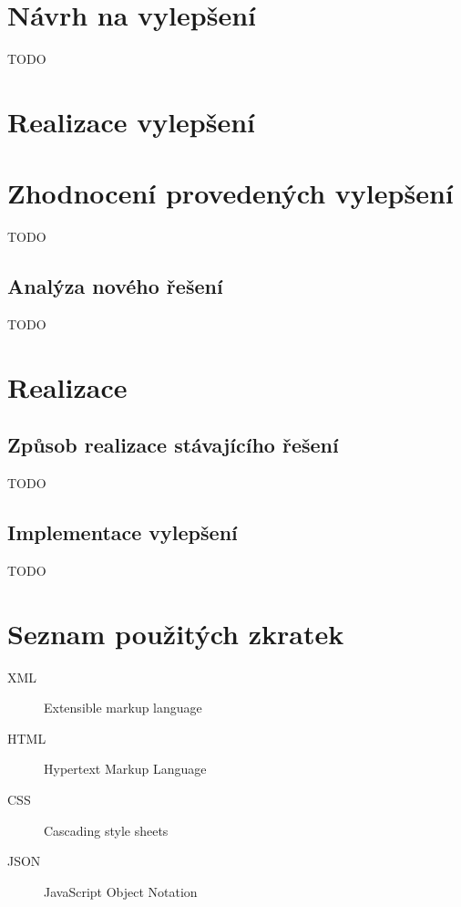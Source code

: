\documentclass[thesis=B,czech]{FITthesis}[2012/06/26]
\begin{document}
\chapter{Návrh na vylepšení}
TODO

\chapter{Realizace vylepšení}

\chapter{Zhodnocení provedených vylepšení}
TODO
\section{Analýza nového řešení}
TODO


\chapter{Realizace}

\section{Způsob realizace stávajícího řešení}
TODO
\section{Implementace vylepšení}
TODO

\begin{conclusion}
\end{conclusion}





\appendix
\chapter{Seznam použitých zkratek}
\begin{description}
	\item[XML] Extensible markup language
	\item[HTML] Hypertext Markup Language
	\item[CSS] Cascading style sheets
	\item[JSON] JavaScript Object Notation
\end{description}
\end{document}
